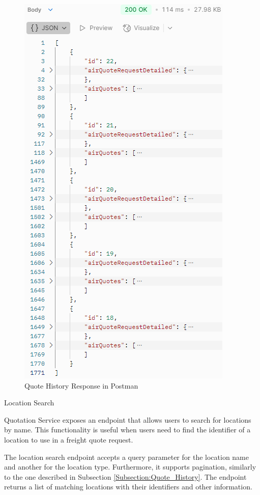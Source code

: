\documentclass[12pt, reqno]{amsbook}
\makeatletter
\def\subsection{\@startsection{subsection}{2}%
      \z@{.5\linespacing\@plus.7\linespacing}{.25\linespacing}%
      {\normalfont\bfseries\flushleft}}
\theoremstyle{definition}
\theoremstyle{definition}
\numberwithin{section}{chapter}
\numberwithin{table}{chapter}
\numberwithin{figure}{chapter}
\makeatother
\begin{document}
\begin{figure}[H]
  \centering
  \includegraphics[width=0.7\linewidth]{images/QuoteHistoryResponsePostman.png}
  \caption{\label{Figure:QuoteHistoryResponsePostman}Quote History Response in Postman}
\end{figure}

\subsection{Location Search}
\label{Subsection:Location_Search}

Quotation Service exposes an endpoint that allows users to search for locations by name. This functionality is useful when users need to find the identifier of a location to use in a freight quote request.

The location search endpoint accepts a query parameter for the location name and another for the location type. Furthermore, it supports pagination, similarly to the one described in Subsection \ref{Subsection:Quote_History}. The endpoint returns a list of matching locations with their identifiers and other information.
\end{document}
